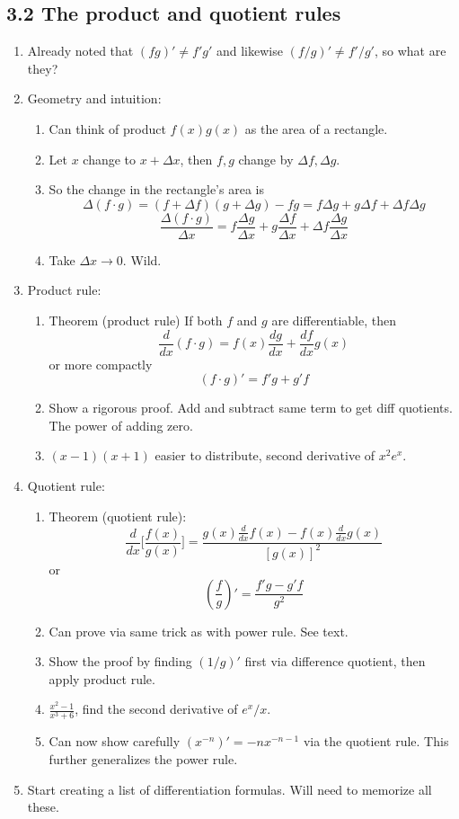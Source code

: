 \documentclass{article}
\begin{document}
\subsection{3.2 The product and quotient rules}
\begin{enumerate}

\item Already noted that $(fg)'\neq f'g'$ and likewise $(f/g)' \neq f'/g'$, so what are they?

\item Geometry and intuition:
\begin{enumerate}
\item Can think of product $f(x)g(x)$ as the area of a rectangle. 
\item Let $x$ change to $x + \Delta x$, then $f,g$ change by $\Delta f, \Delta g$. 
\item So the change in the rectangle's area is 
$$
\Delta (f\cdot g) = (f+\Delta f)(g + \Delta g) - fg
= f\Delta g + g \Delta f + \Delta f \Delta g $$
$$
\frac{\Delta (f\cdot g)}{\Delta x} = f\frac{\Delta g}{\Delta x} + g \frac{\Delta f}{\Delta x} + \Delta f \frac{\Delta g}{\Delta x} 
$$
\item Take $\Delta x \rightarrow 0$. Wild.
\end{enumerate}

\item Product rule: 
\begin{enumerate}
\item Theorem (product rule) If both $f$ and $g$ are differentiable, then 
$$
\frac{d}{dx}(f\cdot g) = f(x)\frac{dg}{dx}+\frac{df}{dx} g(x)
$$
or more compactly
$$
(f\cdot g)' = f'g+g'f
$$
\item Show a rigorous proof. Add and subtract same term to get diff quotients. The power of adding zero.
\item $(x-1)(x+1)$ easier to distribute, second derivative of $x^2e^x$.
\end{enumerate}

\item Quotient rule:
\begin{enumerate}
\item  Theorem (quotient rule):
$$
\frac{d}{dx}\Big[\frac{f(x)}{g(x)}\Big] = \frac{g(x)\frac{d}{dx}f(x)-f(x)\frac{d}{dx}g(x)}{[g(x)]^2}
$$
or
$$
(\frac{f}{g})' = \frac{f'g-g'f}{g^2}
$$
\item Can prove via same trick as with power rule. See text. 
\item Show the proof by finding $(1/g)'$ first via difference quotient, then apply product rule. 
\item  $\frac{x^2-1}{x^3+6}$, find the second derivative of $e^x/x$.
\item Can now show carefully $(x^{-n})' = -nx^{-n-1}$ via the quotient rule. This further generalizes the power rule.
\end{enumerate}


\item Start creating a list of differentiation formulas. Will need to memorize all these. 
\end{enumerate} 
\end{document}
